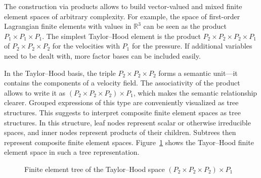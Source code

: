 \documentclass[a4paper,10pt,headings=normal,bibliography=totoc]{scrartcl}
\newcommand{\R}{\mathbb{R}}
\begin{document}
The construction via products allows to build vector-valued and mixed finite element spaces of arbitrary complexity.
For example, the space of
first-order Lagrangian finite elements with values in $\R^3$ can be seen as the product $P_1 \times P_1 \times P_1$.
The simplest Taylor--Hood element is the product $P_2 \times P_2 \times P_2 \times P_1$
of $P_2 \times P_2 \times P_2$ for the velocities with $P_1$ for the pressure.
If additional variables need to be dealt with, more factor bases can be included easily.

In the Taylor--Hood basis, the triple
$P_2 \times P_2 \times P_2$ forms a semantic unit---it contains the components of a velocity field.
The associativity of the product allows to write it
as $(P_2 \times P_2 \times P_2) \times P_1$, which makes the semantic relationship clearer.
Grouped expressions of this type are conveniently visualized as tree structures.  This
suggests to interpret composite
finite element spaces as tree structures.  In this structure, leaf nodes represent scalar or otherwise irreducible spaces,
and inner nodes represent products of their children.  Subtrees then represent composite
finite element spaces.  Figure~\ref{fig:taylor_hood_basis_tree} shows the Tayor--Hood finite element
space in such a tree representation.

\begin{figure}
    \begin{center}
    \end{center}
    \caption{Finite element tree of the Taylor--Hood space $(P_2 \times P_2 \times P_2)\times P_1$}
    \label{fig:taylor_hood_basis_tree}
\end{figure}

\end{document}
